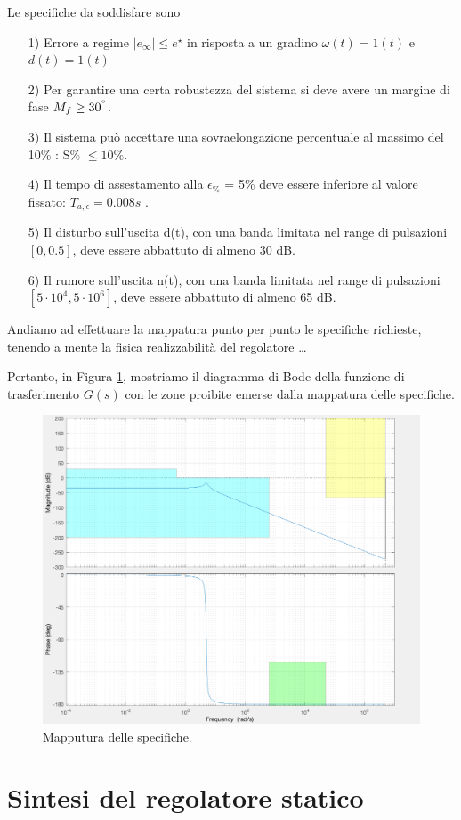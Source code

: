 \documentclass[a4paper, 11pt]{article}
\begin{document}
Le specifiche da soddisfare sono
\begin{itemize}
	\item[1)] Errore a regime $|e_{\infty}| \leq e^{\star}$ in risposta a un gradino $\omega (t) = 1(t)$ e $d(t)=1(t)$
	\item[2)] Per garantire una certa robustezza del sistema si deve avere un margine di fase $M_f \geq 30^{\degree}$.
	\item[3)] Il sistema può accettare una sovraelongazione percentuale al massimo del 10\% : S\% $\leq 10\%$. 
	\item[4)] Il tempo di assestamento alla $\epsilon_{\%}$ = 5\% deve essere inferiore al valore fissato: $T_{a, \epsilon} = 0.008s$ .
	\item[5)] Il disturbo sull'uscita d(t), con una banda limitata nel range di pulsazioni $[0, 0.5]$, deve essere abbattuto di almeno 30 dB.
	\item[6)] Il rumore sull'uscita n(t), con una banda limitata nel range di pulsazioni $[5 \cdot 10^4, 5 \cdot 10^6]$, deve essere abbattuto di almeno 65 dB. 
\end{itemize}
%
Andiamo ad effettuare la mappatura punto per punto le specifiche richieste, tenendo a mente la fisica realizzabilità del regolatore \dots  

Pertanto, in Figura \ref{fig:G_bode_specifiche}, mostriamo il diagramma di Bode della funzione di trasferimento $G(s)$ con le zone proibite emerse dalla mappatura delle specifiche.
\begin{figure}[h!]
	\centering
	\includegraphics[width=0.75\linewidth]{./images/bode_G_mappatura.png}
	\caption{Mapputura delle specifiche.}
	\label{fig:G_bode_specifiche}
\end{figure}

\section{Sintesi del regolatore statico}
\label{sec:static_regulator}
\end{document}
